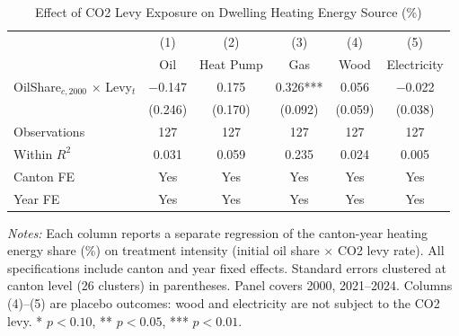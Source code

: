 \begin{table}[H]
\centering
\caption{Effect of CO2 Levy Exposure on Dwelling Heating Energy Source (\%)}
\label{tab:main}
\begin{threeparttable}
\begin{tabular}{lccccc}
\toprule
& (1) & (2) & (3) & (4) & (5) \\
& Oil & Heat Pump & Gas & Wood & Electricity \\
\midrule
OilShare$_{c,2000}$ $\times$ Levy$_t$ & $-$0.147 & 0.175 & 0.326*** & 0.056 & $-$0.022 \\
& (0.246) & (0.170) & (0.092) & (0.059) & (0.038) \\
[0.5em]
Observations & 127 & 127 & 127 & 127 & 127 \\
Within $R^2$ & 0.031 & 0.059 & 0.235 & 0.024 & 0.005 \\
Canton FE & Yes & Yes & Yes & Yes & Yes \\
Year FE & Yes & Yes & Yes & Yes & Yes \\
\bottomrule
\end{tabular}
\begin{tablenotes}[flushleft]
\small
\item \textit{Notes:} Each column reports a separate regression of the canton-year heating energy share (\%) on treatment intensity (initial oil share $\times$ CO2 levy rate). All specifications include canton and year fixed effects. Standard errors clustered at canton level (26 clusters) in parentheses. Panel covers 2000, 2021--2024. Columns (4)--(5) are placebo outcomes: wood and electricity are not subject to the CO2 levy. * $p<0.10$, ** $p<0.05$, *** $p<0.01$.
\end{tablenotes}
\end{threeparttable}
\end{table}
